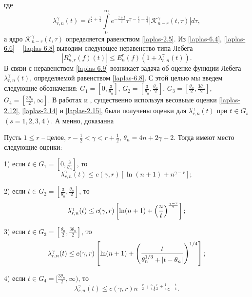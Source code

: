 где
\begin{equation}\label{laplas-6.8}
  \lambda_{r,n}^\gamma(t)=t^{\frac r2+\frac14}\int\limits_0^\infty e^{-\frac{\tau+t}2}\tau^{\gamma-\frac r2-\frac14}|\mathcal{K}_{n-r}^\gamma(t,\tau)|d\tau,
\end{equation}
а ядро $\mathcal{K}_{n-r}^\gamma(t,\tau)$ определяется равенством \eqref{laplas-2.5}.
Из \eqref{laplas-6.4}, \eqref{laplas-6.6} -- \eqref{laplas-6.8} выводим следующее неравенство типа Лебега
\begin{equation}\label{laplas-6.9}
  |R_{n,r}^\gamma(f)(t)|\le E_n^r(f)(1+\lambda_{r,n}^\gamma(t)).
\end{equation}
В связи с неравенством \eqref{laplas-6.9} возникает задача об оценке функции Лебега $\lambda_{r,n}^\gamma(t)$, определяемой равенством \eqref{laplas-6.8}. С этой целью мы введем следующие обозначения: $G_1=[0,\frac3{\theta_n}]$, $G_2=[\frac3{\theta_n},\frac{\theta_n}2]$, $G_3=[\frac{\theta_n}2,\frac{3\theta_n}2]$, $G_4=[\frac{3\theta_n}2,\infty]$. В работах \cite{Shar11} и \cite{Shar12}, существенно используя весовыые оценки \eqref{laplas-2.12}, \eqref{laplas-2.14} и \eqref{laplas-2.15},  были получены оценки для $\lambda_{r,n}^\gamma(t)$ при $t\in G_s$ $(s=1,2,3,4)$. А менно, доказанна

\begin{theorem}
 Пусть $1\le r$ -- целое, $r-\frac12<\gamma< r+\frac12$, $\theta_n=4n+2\gamma+2$. Тогда имеют место следующие оценки:

1) если $t \in G_1=[0,\frac3{\theta_n}]$,  то
\begin{equation}\label{laplas-6.10}
\lambda^\gamma_{r,n}(t) \leq c(\gamma,r)[\ln(n+1)+n^{\gamma-r}];
\end{equation}

2) если $t \in G_2=[\frac3{\theta_n},\frac{\theta_n}2]$, то
\begin{equation}
\lambda_{r,n}^\gamma(t) \leq c(\gamma,r)\left[\ln(n+1)+\left({n\over t}\right)^{\gamma-r\over2}\right];
\label{laplas-6.11}
\end{equation}

3) если $t \in G_3=[\frac{\theta_n}2,\frac{3\theta_n}2]$, то
\begin{equation}
\lambda_{r,n}^\gamma(t) \leq c(\gamma,r)\left[\ln(n+1)+\left({t\over \theta_n^{1/3}+|t-\theta_n| }\right)^{1/4}\right];
\label{laplas-6.12}
\end{equation}

4) если $t \in G_4=[\frac{3\theta_n}2,\infty)$, то
\begin{equation}
\lambda_{r,n}^\gamma(t) \leq c(\gamma,r)n^{-\frac{r}{2}+\frac54}t^{\frac r2+\frac14}e^{-\frac{t}{4}}.
\label{laplas-6.13}
\end{equation}

\end{theorem}



